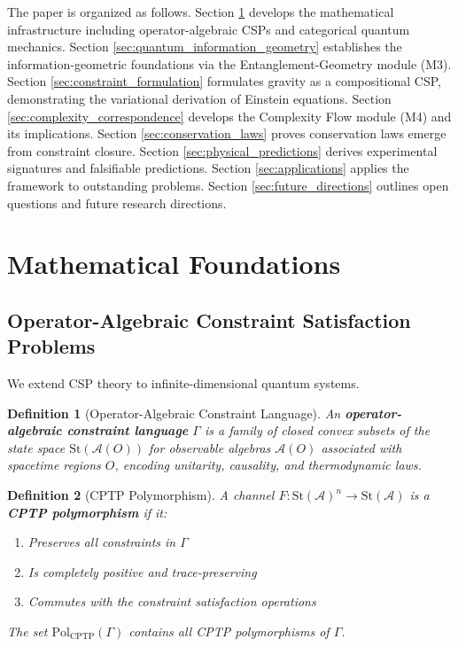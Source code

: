 \documentclass[11pt,a4paper]{article}
\newtheorem{definition}{Definition}[section]
\theoremstyle{remark}
\theoremstyle{definition}
\begin{document}
The paper is organized as follows. Section \ref{sec:mathematical_foundations} develops the mathematical infrastructure including operator-algebraic CSPs and categorical quantum mechanics. Section \ref{sec:quantum_information_geometry} establishes the information-geometric foundations via the Entanglement-Geometry module (M3). Section \ref{sec:constraint_formulation} formulates gravity as a compositional CSP, demonstrating the variational derivation of Einstein equations. Section \ref{sec:complexity_correspondence} develops the Complexity Flow module (M4) and its implications. Section \ref{sec:conservation_laws} proves conservation laws emerge from constraint closure. Section \ref{sec:physical_predictions} derives experimental signatures and falsifiable predictions. Section \ref{sec:applications} applies the framework to outstanding problems. Section \ref{sec:future_directions} outlines open questions and future research directions.

\section{Mathematical Foundations}
\label{sec:mathematical_foundations}

\subsection{Operator-Algebraic Constraint Satisfaction Problems}

We extend CSP theory to infinite-dimensional quantum systems.

\begin{definition}[Operator-Algebraic Constraint Language]
An \textbf{operator-algebraic constraint language} $\Gamma$ is a family of closed convex subsets of the state space $\mathrm{St}(\mathcal{A}(O))$ for observable algebras $\mathcal{A}(O)$ associated with spacetime regions $O$, encoding unitarity, causality, and thermodynamic laws.
\end{definition}

\begin{definition}[CPTP Polymorphism]
A channel $F: \mathrm{St}(\mathcal{A})^n \to \mathrm{St}(\mathcal{A})$ is a \textbf{CPTP polymorphism} if it:
\begin{enumerate}[label=(\roman*)]
\item Preserves all constraints in $\Gamma$
\item Is completely positive and trace-preserving
\item Commutes with the constraint satisfaction operations
\end{enumerate}
The set $\text{Pol}_{\text{CPTP}}(\Gamma)$ contains all CPTP polymorphisms of $\Gamma$.
\end{definition}
\end{document}
